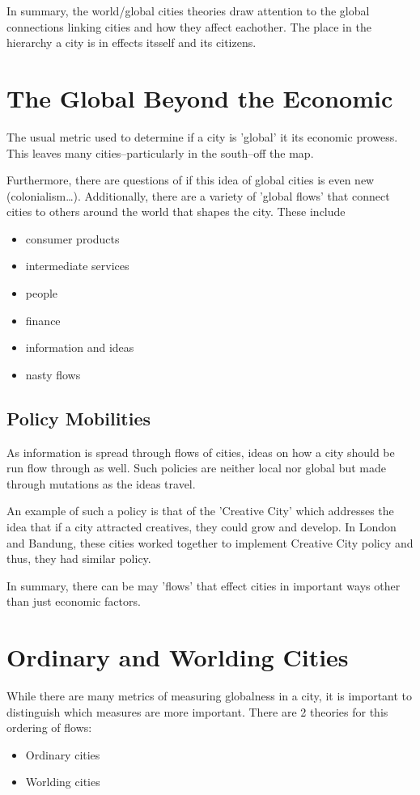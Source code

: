 \documentclass[12pt]{book}
\begin{document}
In summary, the world/global cities theories draw attention to the global connections linking cities and how they affect eachother.
The place in the hierarchy a city is in effects itsself and its citizens.

\section*{The Global Beyond the Economic}
The usual metric used to determine if a city is 'global' it its economic prowess. 
This leaves many cities--particularly in the south--off the map.

Furthermore, there are questions of if this idea of global cities is even new (colonialism\ldots).
Additionally, there are a variety of 'global flows' that connect cities to others around the world that shapes the city.
These include
\begin{itemize}
        \item consumer products
        \item intermediate services
        \item people
        \item finance
        \item information and ideas
        \item nasty flows
\end{itemize}

\subsection*{Policy Mobilities}
As information is spread through flows of cities, ideas on how a city should be run flow through as well.
Such policies are neither local nor global but made through mutations as the ideas travel.

An example of such a policy is that of the 'Creative City' which addresses the idea that if a city attracted creatives,
        they could grow and develop. In London and Bandung, these cities worked together to implement Creative City policy
        and thus, they had similar policy.

In summary, there can be may 'flows' that effect cities in important ways other than just economic factors.


\section*{Ordinary and Worlding Cities}
While there are many metrics of measuring globalness in a city, it is important to distinguish which measures are more important.
There are 2 theories for this ordering of flows:
\begin{itemize}
        \item Ordinary cities
        \item Worlding cities
\end{itemize}
\end{document}
